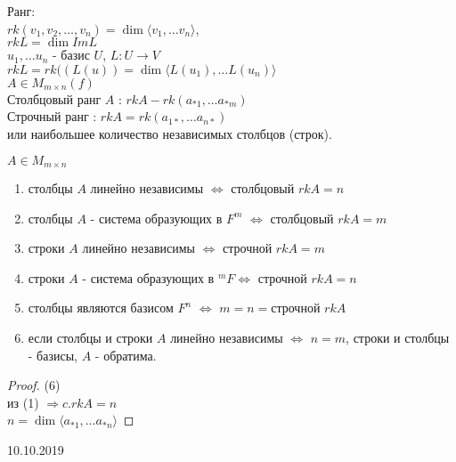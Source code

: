 \documentclass[12pt]{report}
\begin{document}
\begin{defn}Ранг:\\
    $rk (v_1, v_2 , \ldots , v_n) = \dim \langle v_1, \ldots v_n \rangle $, \\
    $rk L = \dim Im L$\\
    $u_1, \ldots u_n $ - базис $U$, $L: U \to V$ \\
    $rk L = rk ((L(u)) = \dim \langle L(u_1), \ldots L(u_n) \rangle $\\
    $A \in M _ {m \times n} (f)$\\
    Столбцовый ранг  $A$ : $rk A - rk(a_{*1}, \ldots a_{*m})$\\
    Строчный ранг : $rk A = rk (a_{1*}, \ldots a_{n*})$\\
    или наибольшее количество независимых столбцов (строк).
\end{defn}
\begin{lm}
    $A \in M_{m \times n}$
     \begin{enumerate}
	 \item столбцы $A$ линейно независимы $\Leftrightarrow$   столбцовый $rk A = n$ 
	 \item столбцы $A$  - система образующих в $F^m$ $\Leftrightarrow$  столбцовый $rk A = m$
	 \item строки $A$ линейно независимы $\Leftrightarrow$ строчной $rk A = m$ 
	 \item строки $A$  - система образующих в $^m F \Leftrightarrow$ строчной $ rk A = n$ 
	 \item столбцы являются базисом $F^n$ $\Leftrightarrow$ $m = n =  \mbox{строчной }rk A$
	 \item если столбцы и строки  $A$ линейно независимы $\Leftrightarrow$ $n = m $, строки и столбцы - базисы, $A$ - обратима.
    \end{enumerate}
\end{lm}
\begin{proof}
    (6)\\
    из (1) $\Rightarrow  c.rk A = n $\\
    $n = \dim \langle a_{*1}, \ldots a_{*n} \rangle $
\end{proof}

10.10.2019
\end{document}
